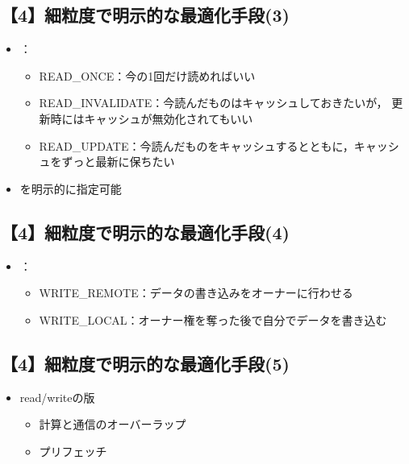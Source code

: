 \documentclass[25pt,landscape,papersize]{jsarticle}
\begin{document}
\subsection{【4】細粒度で明示的な最適化手段(3)}

\begin{itemize}
\item {}：
  \begin{itemize}
  \item READ\_ONCE：今の1回だけ読めればいい
  \item READ\_INVALIDATE：今読んだものはキャッシュしておきたいが，
    更新時にはキャッシュが無効化されてもいい
  \item READ\_UPDATE：今読んだものをキャッシュするとともに，キャッシュをずっと最新に保ちたい
  \end{itemize}
\item {}を明示的に指定可能
\end{itemize}


\subsection{【4】細粒度で明示的な最適化手段(4)}

\begin{itemize}
\item {}：
  \begin{itemize}
  \item WRITE\_REMOTE：データの書き込みをオーナーに行わせる
    \hskip10pt
  \item WRITE\_LOCAL：オーナー権を奪った後で自分でデータを書き込む
    \hskip10pt
  \end{itemize}
\end{itemize}

\subsection{【4】細粒度で明示的な最適化手段(5)}

\begin{itemize}
\item read/writeの版
  \begin{itemize}
  \item 計算と通信のオーバーラップ
  \item プリフェッチ
  \end{itemize}
\end{itemize}
\end{document}

